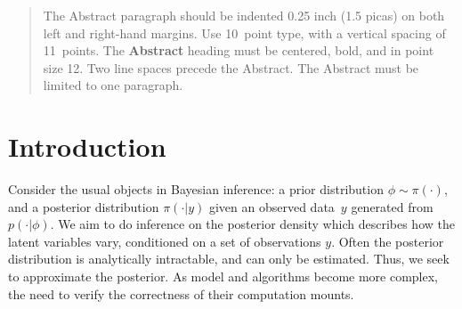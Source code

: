 \documentclass[twoside]{article}
\begin{document}

\begin{abstract}
  The Abstract paragraph should be indented 0.25 inch (1.5 picas) on
  both left and right-hand margins. Use 10~point type, with a vertical
  spacing of 11~points. The \textbf{Abstract} heading must be centered,
  bold, and in point size 12. Two line spaces precede the
  Abstract. The Abstract must be limited to one paragraph.
\end{abstract}

\section{Introduction}
\label{sec:introduction}


Consider the usual objects in Bayesian inference: a prior distribution $\phi \sim \pi(\cdot)$, and a posterior distribution $\pi(\cdot | y)$ given an observed data~$y$ generated from $p(\cdot| \phi)$. We aim to do inference on the posterior density which describes how the latent variables vary, conditioned on a set of observations $y$. Often the posterior distribution is analytically intractable, and can only be estimated. Thus, we seek to approximate the posterior. As model and algorithms become more complex, the need to verify the correctness of their computation mounts.


\end{document}
